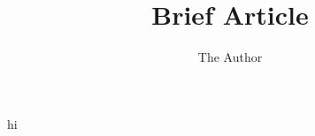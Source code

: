 \documentclass{article}
\title{Brief Article}
\author{The Author}
\begin{document}
	\maketitle
hi
\end{document}
